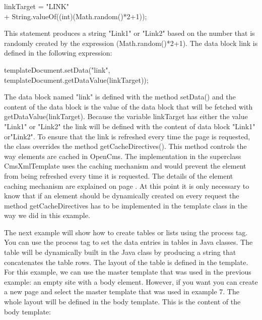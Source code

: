 \begin{java}
linkTarget = "LINK"\\
\jtabd              + String.valueOf((int)(Math.random()*2+1));\\
\end{java}

This statement produces a string {\name "Link1"} or {\name "Link2"} based on the number
that is randomly created by the expression {\name (Math.random()*2+1)}.
The data block link is defined in the following expression:

{\code templateDocument.setData("link",\\
  templateDocument.getDataValue(linkTarget));}

The data block named {\name "link"} is defined with the method {\meth setData()} and
the content of the data block is the value of the data block that will
be fetched with {\meth getDataValue(linkTarget)}. Because the variable
{\name linkTarget} has either the value {\name "Link1"} or {\name "Link2"} the link will be
defined with the content of data block {\name "Link1"} or{\name  "Link2"}.
To ensure that the link is refreshed every time the page is requested,
the class overrides the method {\meth getCacheDirectives()}. This method controls
the way elements are cached in OpenCms. The implementation in the superclass
{\class CmsXmlTemplate} uses the caching mechanism and would prevent the element
from being refreshed every time it is requested. The details of the element caching mechanism 
are explained on page \pageref{element cache}.
At this point it is only necessary to know that if an element should be dynamically created
on every request the method {\meth getCacheDirectives} has to be implemented in the template class
in the way we did in this example.


The next example will show how to create tables or lists using the
{\tag process} tag. You can use the {\tag process} tag to set the data entries in
tables in Java classes. The table will be dynamically built in the Java
class by producing a string that concatenates the table rows. The
layout of the table is defined in the template. For this example, we
can use the master template that was used in the previous example: an
empty site with a body element. However, if you want you can create a
new page and select the master template that was used in {\name example 7.} The
whole layout will be defined in the body template. This is the content
of the body template:

